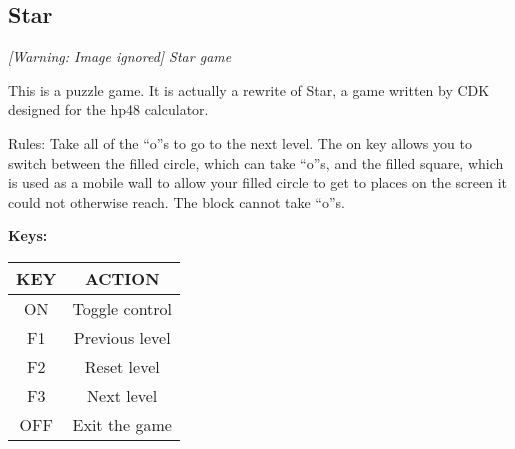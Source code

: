 \subsection{Star}
{\centering\itshape
  [Warning: Image ignored] %
 \newline
Star game
\par}

This is a puzzle game.  It is actually a rewrite of Star, a game written
by CDK designed for the hp48 calculator.

Rules: Take all of the ``o''s to go to the
next level.  The on key allows you to switch between the filled circle,
which can take ``o''s, and the filled square, which is used as a mobile
wall to allow your filled circle to get to places on the screen it
could not otherwise reach. The block cannot take ``o''s.

{\bfseries
Keys:}

\begin{table}[h!]
\begin{center}
\begin{tabular}{|c|c|}
\hline
KEY & ACTION \\\hline
ON & Toggle control \\\hline
F1 & Previous level \\\hline
F2 & Reset level \\\hline
F3 & Next level \\\hline
OFF & Exit the game \\\hline
\end{tabular}
\end{center}
\end{table}


